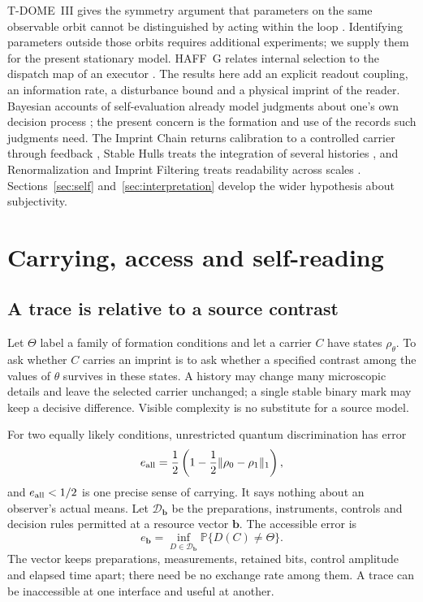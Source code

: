 \documentclass[11pt,a4paper]{article}
\newcommand{\Prb}{\mathbb P}
\begin{document}
T-DOME~III gives the symmetry argument that parameters on the same observable orbit cannot be distinguished by acting within the loop \cite{TDIII}. Identifying parameters outside those orbits requires additional experiments; we supply them for the present stationary model. HAFF~G relates internal selection to the dispatch map of an executor \cite{HAFFG}. The results here add an explicit readout coupling, an information rate, a disturbance bound and a physical imprint of the reader. Bayesian accounts of self-evaluation already model judgments about one's own decision process \cite{FlemingDaw2017}; the present concern is the formation and use of the records such judgments need. The Imprint Chain returns calibration to a controlled carrier through feedback \cite{ImprintChain}, Stable Hulls treats the integration of several histories \cite{StableHulls}, and Renormalization and Imprint Filtering treats readability across scales \cite{ImprintRG}. Sections~\ref{sec:self} and~\ref{sec:interpretation} develop the wider hypothesis about subjectivity.

\section{Carrying, access and self-reading}\label{sec:carrying}

\subsection{A trace is relative to a source contrast}

Let $\Theta$ label a family of formation conditions and let a carrier $C$ have states $\rho_\theta$. To ask whether $C$ carries an imprint is to ask whether a specified contrast among the values of $\theta$ survives in these states. A history may change many microscopic details and leave the selected carrier unchanged; a single stable binary mark may keep a decisive difference. Visible complexity is no substitute for a source model.

For two equally likely conditions, unrestricted quantum discrimination has error
\[
 e_{\rm all}=\frac12\left(1-\frac12\|\rho_0-\rho_1\|_1\right),
\]
and $e_{\rm all}<1/2$ is one precise sense of carrying. It says nothing about an observer's actual means. Let $\mathcal D_{\mathbf b}$ be the preparations, instruments, controls and decision rules permitted at a resource vector $\mathbf b$. The accessible error is
\begin{equation}\label{eq:access}
 e_{\mathbf b}=\inf_{D\in\mathcal D_{\mathbf b}}\Prb\{D(C)\ne\Theta\}.
\end{equation}
The vector keeps preparations, measurements, retained bits, control amplitude and elapsed time apart; there need be no exchange rate among them. A trace can be inaccessible at one interface and useful at another.
\end{document}
